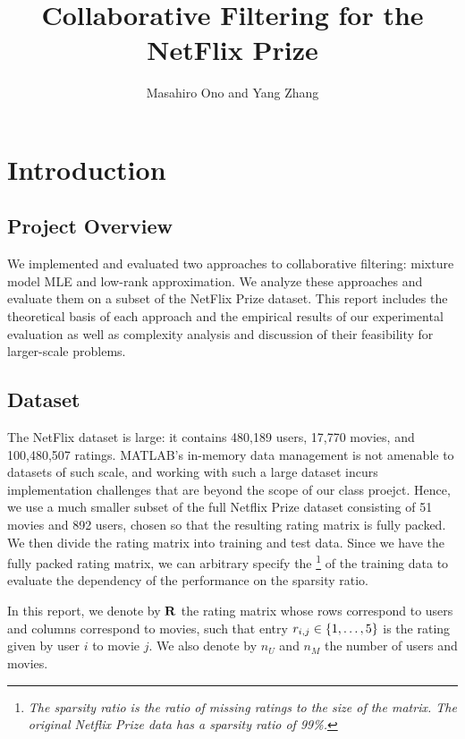 \documentclass{article}
\title{Collaborative Filtering for the NetFlix Prize}
\author{Masahiro Ono and Yang Zhang}
\begin{document}
\maketitle

\tableofcontents

\section{Introduction}

\subsection{Project Overview}

We implemented and evaluated two approaches to collaborative
filtering: mixture model MLE and low-rank approximation. We analyze
these approaches and evaluate them on a subset of the NetFlix Prize
dataset. This report includes the theoretical basis of each approach
and the empirical results of our experimental evaluation as well as
complexity analysis and discussion of their feasibility for
larger-scale problems.

\subsection{Dataset}

The NetFlix dataset is large: it contains 480,189 users, 17,770
movies, and 100,480,507 ratings. MATLAB's in-memory data management is
not amenable to datasets of such scale, and working with such a large
dataset incurs implementation challenges that are beyond the scope of
our class proejct. Hence, we use a much smaller subset of the full
Netflix Prize dataset consisting of 51 movies and 892 users, chosen so
that the resulting rating matrix is fully packed. We then divide the
rating matrix into training and test data. Since we have the fully
packed rating matrix, we can arbitrary specify the \footnote{\textit{The sparsity ratio is the ratio of missing
    ratings to the size of the matrix. The original Netflix Prize data
    has a sparsity ratio of 99\%.}} of the training data to evaluate
the dependency of the performance on the sparsity ratio.

In this report, we denote by ${\bf R}$ the rating matrix whose rows
correspond to users and columns correspond to movies, such that entry
$r_{i,j} \in {\left\{ 1, \dots, 5 \right\}}$ is the rating given by user $i$ to movie
$j$. We also denote by $n_U$ and $n_M$ the number of users and movies.
\end{document}
